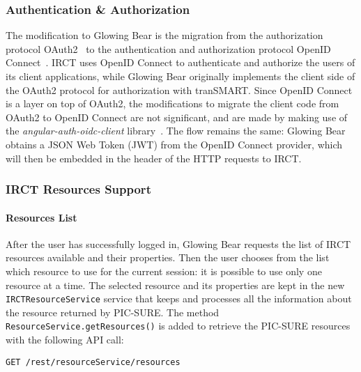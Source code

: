 \subsubsection{Authentication \& Authorization}

The modification to Glowing Bear is the migration from the authorization protocol OAuth2~\cite{oauth2} to the authentication and authorization protocol OpenID Connect~\cite{openidconnect}.
IRCT uses OpenID Connect to authenticate and authorize the users of its client applications, while Glowing Bear originally implements the client side of the OAuth2 protocol for authorization with tranSMART. 
Since OpenID Connect is a layer on top of OAuth2, the modifications to migrate the client code from OAuth2 to OpenID Connect are not significant, and are made by making use of the \emph{angular-auth-oidc-client} library~\cite{angular-auth-oidc-client}.
The flow remains the same: Glowing Bear obtains a JSON Web Token (JWT) from the OpenID Connect provider, which will then be embedded in the header of the HTTP requests to IRCT.

\subsubsection{IRCT Resources Support}

\paragraph{Resources List}
After the user has successfully logged in, Glowing Bear requests the list of IRCT resources available and their properties.
Then the user chooses from the list which resource to use for the current session: it is possible to use only one resource at a time.
The selected resource and its properties are kept in the new \verb|IRCTResourceService| service that keeps and processes all the information about the resource returned by PIC-SURE.
The method \verb|ResourceService.getResources()| is added to retrieve the PIC-SURE resources with the following API call:
\begin{verbatim}
GET /rest/resourceService/resources
\end{verbatim}

